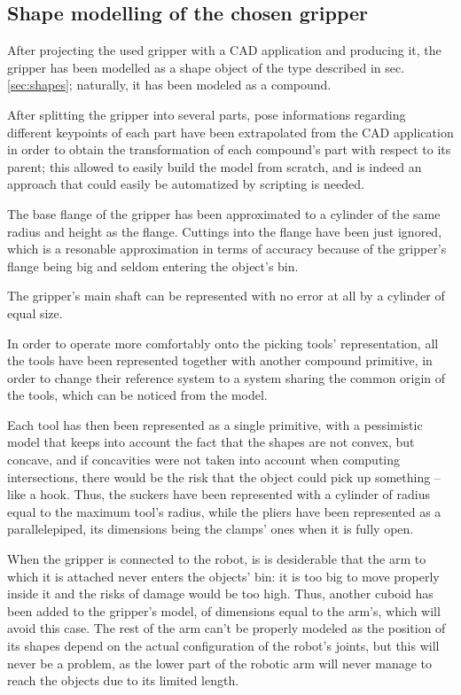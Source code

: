 \subsection{Shape modelling of the chosen gripper}
After projecting the used gripper with a CAD application and producing it, the
gripper has been modelled as a shape object of the type described in sec.
\ref{sec:shapes}; naturally, it has been modeled as a compound.

After splitting the gripper into several parts, pose informations regarding
different keypoints of each part have been
extrapolated from the CAD application in order to obtain the transformation of
each compound's part with respect to its parent; this allowed to easily build
the model from scratch, and is indeed an approach that could easily be automatized by
scripting is needed.

The base flange of the gripper has been approximated to a cylinder of the same
radius and height as the flange. Cuttings into the flange have been just
ignored, which is a resonable approximation in terms of accuracy because 
of the gripper's flange being big and seldom entering the object's bin.

The gripper's main shaft can be represented with no error at all by a cylinder
of equal size.

In order to operate more comfortably onto the picking tools' representation,
all the tools have been represented together with another compound primitive,
in order to change their reference system to a system sharing the common origin
of the tools, which can be noticed from the model.

Each tool has then been represented as a single primitive, with a pessimistic
model that  
keeps into account the fact that the shapes are not convex, but concave, and if
concavities were not taken into account when computing intersections, there
would be the risk that the object could pick up something -- like a hook. Thus,
the suckers have been represented with a cylinder of radius equal to the maximum
tool's radius, while the pliers have been represented as a parallelepiped, its
dimensions being the clamps' ones when it is fully open.

When the gripper is connected to the robot, is is desiderable that the arm to
which it is attached never enters the objects' bin: it is too big to move
properly inside it and the risks of damage would be too high. Thus, another
cuboid has been added to the gripper's model, of dimensions equal to the arm's,
which will avoid this case. The rest of the arm can't be properly modeled as
the position of its shapes depend on the actual configuration of the robot's
joints, but this will never be a problem, as the lower part of the robotic arm
will never manage to reach the objects due to its limited length.

